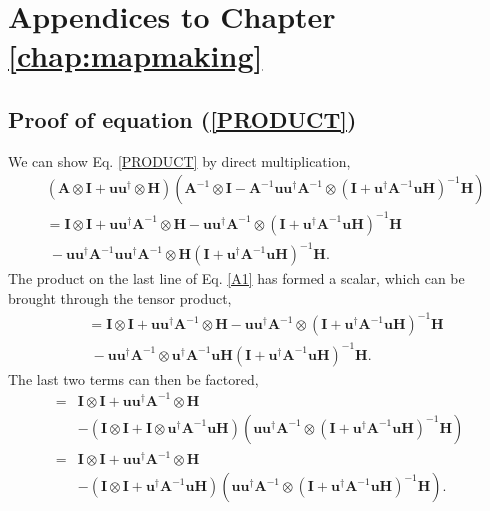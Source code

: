 \chapter{Appendices to Chapter \ref{chap:mapmaking}}

\section{Proof of equation (\ref{PRODUCT})} 
\label{app:mm:sec:proof}

We can show Eq. \eqref{PRODUCT} by direct multiplication,
\begin{align}
&\left(\mathbf{A} \otimes \mathbf{I} + \mathbf{u}\mathbf{u}^\dagger \otimes \mathbf{H} \right) 
 \left( \mathbf{A}^{-1} \otimes \mathbf{I} - \mathbf{A}^{-1}\mathbf{u}\mathbf{u}^\dagger\mathbf{A}^{-1} \otimes \left(\mathbf{I} + \mathbf{u}^\dagger\mathbf{A}^{-1}\mathbf{u} \mathbf{H}\right)^{-1} \mathbf{H} \right)
 \nonumber \\
 &= \mathbf{I} \otimes \mathbf{I} + \mathbf{u}\mathbf{u}^\dagger\mathbf{A}^{-1} \otimes \mathbf{H} - \mathbf{u}\mathbf{u}^\dagger\mathbf{A}^{-1}\otimes \left(\mathbf{I} + \mathbf{u}^\dagger\mathbf{A}^{-1}\mathbf{u} \mathbf{H}\right)^{-1} \mathbf{H}
\nonumber \\
&~- \mathbf{u}\mathbf{u}^\dagger\mathbf{A}^{-1}\mathbf{u}\mathbf{u}^\dagger\mathbf{A}^{-1}\otimes \mathbf{H} \left(\mathbf{I} + \mathbf{u}^\dagger\mathbf{A}^{-1}\mathbf{u} \mathbf{H}\right)^{-1} \mathbf{H}. \label{A1}
\end{align}
The product on the last line of Eq. \eqref{A1} has formed a scalar, which can be brought through the tensor product,
\begin{align}
&= \mathbf{I} \otimes \mathbf{I} + \mathbf{u}\mathbf{u}^\dagger\mathbf{A}^{-1} \otimes \mathbf{H} - \mathbf{u}\mathbf{u}^\dagger\mathbf{A}^{-1}\otimes \left(\mathbf{I} + \mathbf{u}^\dagger\mathbf{A}^{-1}\mathbf{u} \mathbf{H}\right)^{-1} \mathbf{H}
\nonumber \\
&~- \mathbf{u}\mathbf{u}^\dagger\mathbf{A}^{-1}\otimes \mathbf{u}^\dagger\mathbf{A}^{-1}\mathbf{u}\mathbf{H} \left(\mathbf{I} + \mathbf{u}^\dagger\mathbf{A}^{-1}\mathbf{u}\mathbf{H}\right)^{-1} \mathbf{H}. 
\end{align}
The last two terms can then be factored,
\begin{align}
=& \mathbf{I} \otimes \mathbf{I} + \mathbf{u}\mathbf{u}^\dagger\mathbf{A}^{-1} \otimes \mathbf{H} 
\\ \nonumber &- \left( \mathbf{I} \otimes \mathbf{I} + \mathbf{I} \otimes \mathbf{u}^\dagger\mathbf{A}^{-1}\mathbf{u} \mathbf{H}\right)
 \left( \mathbf{u}\mathbf{u}^\dagger\mathbf{A}^{-1} \otimes \left(\mathbf{I} + \mathbf{u}^\dagger\mathbf{A}^{-1}\mathbf{u}\mathbf{H}\right)^{-1} \mathbf{H}\right)
\\ =& \mathbf{I} \otimes \mathbf{I} + \mathbf{u}\mathbf{u}^\dagger\mathbf{A}^{-1} \otimes \mathbf{H} 
\\ \nonumber &- \left( \mathbf{I} \otimes \mathbf{I} + \mathbf{u}^\dagger\mathbf{A}^{-1}\mathbf{u} \mathbf{H} \right)
 \left( \mathbf{u}\mathbf{u}^\dagger\mathbf{A}^{-1} \otimes \left(\mathbf{I} + \mathbf{u}^\dagger\mathbf{A}^{-1}\mathbf{u}\mathbf{H}\right)^{-1} \mathbf{H}\right).
 \end{align}
